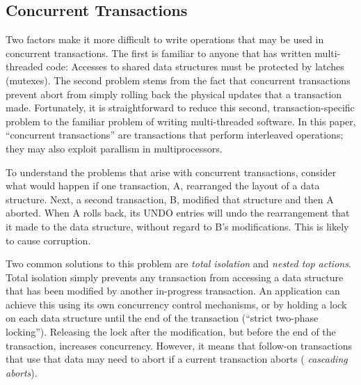 \documentclass[letterpaper,twocolumn,10pt]{article}
\newcommand{\yads}{Stasis'\xspace}
\begin{document}
\subsection{Concurrent Transactions}
\label{sec:nta}

Two factors make it more difficult to write operations that may be
used in concurrent transactions.  The first is familiar to anyone that
has written multi-threaded code: Accesses to shared data structures
must be protected by latches (mutexes).  The second problem stems from
the fact that concurrent transactions prevent abort from simply
rolling back the physical updates that a transaction made.
Fortunately, it is straightforward to reduce this second,
transaction-specific problem to the familiar problem of writing
multi-threaded software.  In this paper, ``concurrent
transactions'' are transactions that perform interleaved operations; they may also exploit parallism in multiprocessors.


To understand the problems that arise with concurrent transactions,
consider what would happen if one transaction, A, rearranged the
layout of a data structure.  Next, a second transaction, B,
modified that structure and then A aborted.  When A rolls back, its
UNDO entries will undo the rearrangement that it made to the data
structure, without regard to B's modifications.  This is likely to
cause corruption.

Two common solutions to this problem are {\em total isolation} and
{\em nested top actions}.  Total isolation simply prevents any
transaction from accessing a data structure that has been modified by
another in-progress transaction.  An application can achieve this
using its own concurrency control mechanisms, or by holding a lock on
each data structure until the end of the transaction (``strict two-phase locking'').  Releasing the
lock after the modification, but before the end of the transaction,
increases concurrency.  However, it means that follow-on transactions that use
that data may need to abort if a current transaction aborts ({\em
cascading aborts}). 

\end{document}
